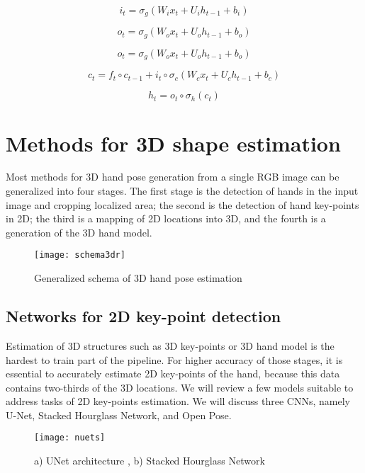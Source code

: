 \begin{equation}
i_t = \sigma_g(W_ix_t + U_ih_{t-1} + b_i)
\end{equation}

\begin{equation}
o_t = \sigma_g(W_ox_t + U_oh_{t-1} + b_o)
\end{equation}

\begin{equation}
o_t = \sigma_g(W_ox_t + U_oh_{t-1} + b_o)
\end{equation}

\begin{equation}
c_t = f_t\circ c_{t-1} + i_t \circ \sigma_c(W_cx_t + U_ch_{t-1} + b_c)
\end{equation}

\begin{equation}
h_t = o_t\circ \sigma_h(c_t)
\end{equation}

\section{Methods for 3D shape estimation}

Most methods for 3D hand pose generation from a single RGB image can be generalized into four stages. The first stage is the detection of hands in the input image and cropping localized area; the second is the detection of hand key-points in 2D; the third is a mapping of 2D locations into 3D, and the fourth is a generation of the 3D hand model.


\begin{figure}[h]
\caption{Generalized schema of 3D hand pose estimation}
\texttt{[image: schema3dr]}
\end{figure}

\subsection{Networks for 2D key-point detection}
Estimation of 3D structures such as 3D key-points or 3D hand model is the hardest to train part of the pipeline. For higher accuracy of those stages, it is essential to accurately estimate 2D key-points of the hand, because this data contains two-thirds of the 3D locations. We will review a few models suitable to address tasks of 2D key-points estimation. We will discuss three CNNs, namely U-Net, Stacked Hourglass Network, and Open Pose. 

\begin{figure}
\caption{a) U\-Net architecture \cite{25} , b) Stacked Hourglass Network \cite{27}}
\centering
\texttt{[image: nuets]}
\end{figure}

